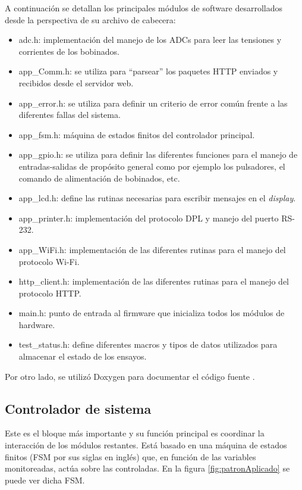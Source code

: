 A continuación se detallan los principales módulos de software desarrollados desde la perspectiva de su archivo de cabecera:

\begin{itemize}
\item adc.h: implementación del manejo de los ADCs para leer las tensiones y corrientes de los bobinados.
\item app\_Comm.h: se utiliza para ``parsear'' los paquetes HTTP enviados y recibidos desde el servidor web.
\item app\_error.h: se utiliza para definir un criterio de error común frente a las diferentes fallas del sistema.
\item app\_fsm.h: máquina de estados finitos del controlador principal.
\item app\_gpio.h: se utiliza para definir las diferentes funciones para el manejo de entradas-salidas de propósito general como por ejemplo los pulsadores, el comando de alimentación de bobinados, etc.
\item app\_lcd.h: define las rutinas necesarias para escribir mensajes en el \textit{display}.
\item app\_printer.h: implementación del protocolo DPL y manejo del puerto RS-232.
\item app\_WiFi.h: implementación de las diferentes rutinas para el manejo del protocolo Wi-Fi.
\item http\_client.h: implementación de las diferentes rutinas para el manejo del protocolo HTTP.
\item main.h: punto de entrada al firmware que inicializa todos los módulos de hardware.
\item test\_status.h: define diferentes macros y tipos de datos utilizados para almacenar el estado de los ensayos.
\end{itemize}

Por otro lado, se utilizó Doxygen para documentar el código fuente \citep{DOXYGEN}.

\subsection{Controlador de sistema}
\label{sec:ContSist}

Este es el bloque más importante y su función principal es coordinar la interacción de los módulos restantes. Está basado en una máquina de estados finitos (FSM por sus siglas en inglés) que, en función de las variables monitoreadas, actúa sobre las controladas. En la figura \ref{fig:patronAplicado} se puede ver dicha FSM.

